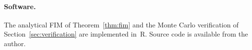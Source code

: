 \documentclass[12pt]{article}
\theoremstyle{remark}
\begin{document}
\paragraph{Software.}
The analytical FIM of Theorem~\ref{thm:fim} and the Monte Carlo
verification of Section~\ref{sec:verification} are implemented in~R.
Source code is available from the author.




\end{document}
